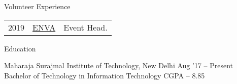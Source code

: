 \documentclass{resume} %
\begin{document}

\begin{rSection}{Volunteer Experience}
  \begin{tabular}{rll}
2019	     & {\href{https://github.com/moz-niec/}{ENVA}}  & Event Head.\\
\end{tabular}
\end{rSection}


\begin{rSection}{Education}
  \begin{rEducationSection}{Maharaja Surajmal Institute of Technology, New Delhi}
                           {Aug '17 -- Present}
                           {Bachelor of Technology in Information Technology}
                           {CGPA -- 8.85}
  \end{rEducationSection}
\end{rSection}
\end{document}
